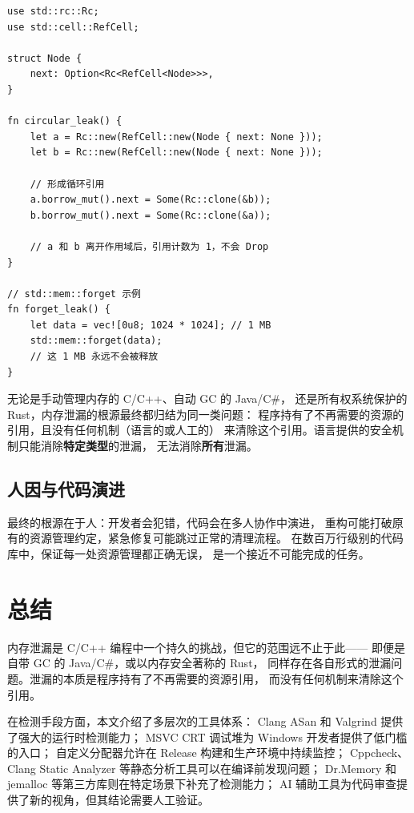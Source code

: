 \documentclass[12pt,a4paper,fontset=fandol]{ctexbook}
\begin{document}
\begin{lstlisting}[style=cppstyle, caption={Rust 中的内存泄漏模式}]
use std::rc::Rc;
use std::cell::RefCell;

struct Node {
    next: Option<Rc<RefCell<Node>>>,
}

fn circular_leak() {
    let a = Rc::new(RefCell::new(Node { next: None }));
    let b = Rc::new(RefCell::new(Node { next: None }));

    // 形成循环引用
    a.borrow_mut().next = Some(Rc::clone(&b));
    b.borrow_mut().next = Some(Rc::clone(&a));

    // a 和 b 离开作用域后，引用计数为 1，不会 Drop
}

// std::mem::forget 示例
fn forget_leak() {
    let data = vec![0u8; 1024 * 1024]; // 1 MB
    std::mem::forget(data);
    // 这 1 MB 永远不会被释放
}
\end{lstlisting}

\begin{guideline}[title={跨语言的共性}]
无论是手动管理内存的 C/C++、自动 GC 的 Java/C\#，
还是所有权系统保护的 Rust，内存泄漏的根源最终都归结为同一类问题：
程序持有了不再需要的资源的引用，且没有任何机制（语言的或人工的）
来清除这个引用。语言提供的安全机制只能消除\textbf{特定类型}的泄漏，
无法消除\textbf{所有}泄漏。
\end{guideline}

\subsection{人因与代码演进}

最终的根源在于人：开发者会犯错，代码会在多人协作中演进，
重构可能打破原有的资源管理约定，紧急修复可能跳过正常的清理流程。
在数百万行级别的代码库中，保证每一处资源管理都正确无误，
是一个接近不可能完成的任务。


\section{总结}

内存泄漏是 C/C++ 编程中一个持久的挑战，但它的范围远不止于此——
即便是自带 GC 的 Java/C\#，或以内存安全著称的 Rust，
同样存在各自形式的泄漏问题。泄漏的本质是程序持有了不再需要的资源引用，
而没有任何机制来清除这个引用。

在检测手段方面，本文介绍了多层次的工具体系：
Clang ASan 和 Valgrind 提供了强大的运行时检测能力；
MSVC CRT 调试堆为 Windows 开发者提供了低门槛的入口；
自定义分配器允许在 Release 构建和生产环境中持续监控；
Cppcheck、Clang Static Analyzer 等静态分析工具可以在编译前发现问题；
Dr.Memory 和 jemalloc 等第三方库则在特定场景下补充了检测能力；
AI 辅助工具为代码审查提供了新的视角，但其结论需要人工验证。
\end{document}
